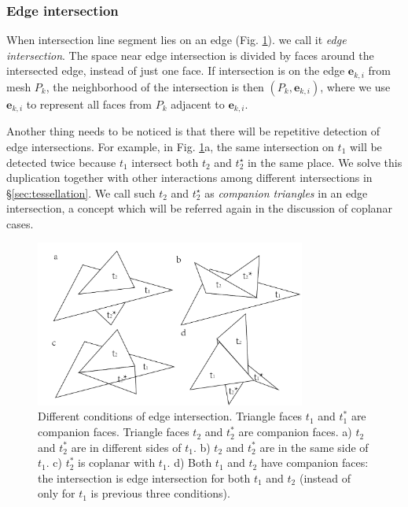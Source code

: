 \documentclass[10pt,journal,compsoc]{IEEEtran}
\begin{document}
\subsubsection{Edge intersection}


When intersection line segment lies on an edge (Fig. \ref{fig:twin}). we call it \emph{edge intersection}. The space near edge intersection is divided by faces around the intersected edge, instead of just one face. If intersection is on the edge $\bm{e}_{k, i}$ from mesh $P_k$, the neighborhood of the intersection is then $(P_k, \bm{e}_{k, i})$, where we use $\bm{e}_{k, i}$ to represent all faces from $P_k$ adjacent to $\bm{e}_{k, i}$.

Another thing needs to be noticed is that there will be repetitive detection of edge intersections. For example, in Fig. \ref{fig:twin}a, the same intersection on $t_1$ will be detected twice because $t_1$ intersect both $t_2$ and $t_2^{\star}$ in the same place. We solve this duplication together with other interactions among different intersections in \S\ref{sec:tessellation}. We call such $t_2$ and $t_2^{\star}$ as \emph{companion triangles} in an edge intersection, a concept which will be referred again in the discussion of coplanar cases.

\begin{figure}[t]
\centering
\includegraphics[width=3.5in]{edgeisect}
\caption{Different conditions of edge intersection. Triangle faces $t_1$ and $t_1^*$ are companion faces. Triangle faces $t_2$ and $t_2^*$ are companion faces. a) $t_2$ and $t_2^*$ are in different sides of $t_1$. b) $t_2$ and $t_2^*$ are in the same side of $t_1$. c) $t_2^*$ is coplanar with $t_1$. d) Both $t_1$ and $t_2$ have companion faces: the intersection is edge intersection for both $t_1$ and $t_2$ (instead of only for $t_1$ is previous three conditions). }
\label{fig:twin}
\end{figure}
\end{document}
